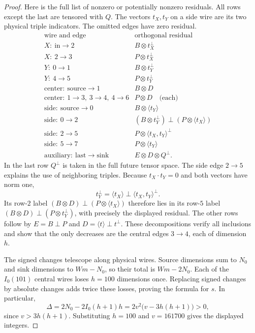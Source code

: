 \begin{proof}
Here is the full list of nonzero or potentially nonzero residuals.
All rows except the last are tensored with $Q$.  The vectors
$t_X,t_Y$ on a side wire are its two physical triple indicators.
The omitted edges have zero residual.
\[
\begin{array}{l|l}
 \text{wire and edge}&\text{orthogonal residual}\\\hline
 X:\ \mathrm{in}\to2&B\otimes t_X^\perp\\
 X:\ 2\to3&P\otimes t_X^\perp\\
 Y:\ 0\to1&B\otimes t_Y^\perp\\
 Y:\ 4\to5&P\otimes t_Y^\perp\\
 \text{center}:\ \mathrm{source}\to1&B\otimes D\\
 \text{center}:\ 1\to3,\ 3\to4,\ 4\to6&P\otimes D\quad\text{(each)}\\
 \text{side}:\ \mathrm{source}\to0&B\otimes\langle t_Y\rangle\\
 \text{side}:\ 0\to2&(B\otimes t_Y^\perp)\mathbin\perp
                              (P\otimes\langle t_X\rangle)\\
 \text{side}:\ 2\to5&P\otimes\langle t_X,t_Y\rangle^\perp\\
 \text{side}:\ 5\to7&P\otimes\langle t_Y\rangle\\
 \text{auxiliary}:\ \mathrm{last}\to\mathrm{sink}
                         &E\otimes D\otimes Q^\perp.
\end{array}
\]
In the last row $Q^\perp$ is taken in the full future tensor space.
The side edge $2\to5$ explains the use of neighboring triples.
Because $t_X\cdot t_Y=0$ and both vectors have norm one,
\[
 t_Y^\perp=\langle t_X\rangle\mathbin\perp
                    \langle t_X,t_Y\rangle^\perp.
\]
Its row-$2$ label $(B\otimes D)\mathbin\perp
(P\otimes\langle t_X\rangle)$ therefore lies in its row-$5$
label $(B\otimes D)\mathbin\perp(P\otimes t_Y^\perp)$,
with precisely the displayed residual.  The other rows follow by
$E=B\mathbin\perp P$ and
$D=\langle t\rangle\mathbin\perp t^\perp$.
These decompositions verify all inclusions and show that the only
decreases are the central edges $3\to4$, each of dimension $h$.

The signed changes telescope along physical wires.  Source
dimensions sum to $N_0$ and sink dimensions to $Wm-N_0$, so their
total is $Wm-2N_0$.  Each of the $I_0(101)$ central wires loses
$h=100$ dimensions once.  Replacing signed changes by absolute
changes adds twice these losses, proving the formula for $s$.
In particular,
\[
 \Delta=2N_0-2I_0(h+1)h
       =2v^2\bigl(v-3h(h+1)\bigr)>0,
\]
since $v>3h(h+1)$.  Substituting $h=100$ and $v=161700$ gives
the displayed integers.


\end{proof}
